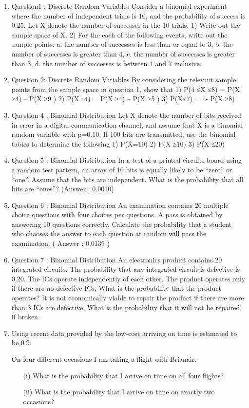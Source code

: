 \documentclass[]{article}
\begin{document}
\begin{enumerate}
\item Question1 : Discrete Random Variables
Consider a binomial experiment where the number of independent trials is 10, and the probability of success is 0.25. Let X denote the number of successes in the 10 trials.
1)	Write out the sample space of X.
2)	For the each of the following events, write out the sample points:
a.	the number of successes is less than or equal to 3,
b.	the number of successes is greater than 4, 
c.	the number of successes is greater than 8, 
d.	the number of successes is between 4 and 7 inclusive.
\item Question 2: Discrete Random Variables
By considering the relevant sample points from the sample space in question 1, show that 
1)	P(4 ≤X ≤8) = P(X ≥4) – P(X ≥9 )
2)	P(X=4) = P(X ≥4) – P(X ≥5 )
3)	P(X≤7) = 1- P(X ≥8)
\item Question 4 : Binomial Distribution
Let X denote the number of bits received in error in a digital communication channel, and assume that X is a binomial random variable with p=0.10. If 100 bits are transmitted, use the binomial tables to determine the following
1)	P(X=10)
2)	P(X ≥10)
3)	P(X ≤20)
\item Question 5 : Binomial Distribution
In a test of a printed circuits board using a random test pattern,  an array of 10 bits is equally likely to be “zero” or “one”. Assume that the bits are independent. 
What is the probability that all bits are “ones”?  (Answer : 0.0010)

\item Question 6 : Binomial Distribution
An examination contains 20 multiple choice questions with four choices per questions. A pass is obtained by answering  10 questions correctly. Calculate the probability that a student who chooses the answer to each question at random will pass the examination.  ( Answer : 0.0139 )

\item Question 7 : Binomial Distribution
An electronics product contains 20 integrated circuits. The probability that any integrated circuit is defective is 0.20. The ICs operate independently of each other.  The product operates only if there are no defective ICs. What is the probability that the product operates?
It is not economically viable to repair the product if there are more than 3 ICs are defective.  What is the probability that it will not be repaired if broken.

\item
Using recent data provided by the low-cost arriving on time is estimated to be 0.9. 

On four different occasions I am taking a flight with Brianair. 
\begin{itemize}
	\item[(i)] What is the probability that I arrive on time on all four flights? 
	\item[(ii)] What is the probability that I arrive on time on exactly two occasions? 
\end{itemize}


\end{enumerate}
\end{document}
